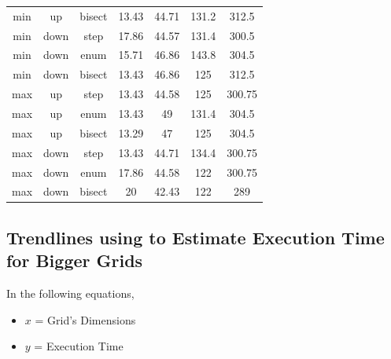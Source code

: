 \documentclass[runningheads]{llncs}
\begin{document}
\begin{table} [h]
\begin{tabularx}{\textwidth}{|C|C|C|C|C|C|C|}
        min      & up   & bisect & 13.43 & 44.71 & 131.2  & 312.5  \\
        min      & down & step   & 17.86 & 44.57 & 131.4  & 300.5  \\
        min      & down & enum   & 15.71 & 46.86 & 143.8  & 304.5  \\
        min      & down & bisect & 13.43 & 46.86 & 125    & 312.5  \\
        max      & up   & step   & 13.43 & 44.58 & 125    & 300.75 \\
        max      & up   & enum   & 13.43 & 49    & 131.4  & 304.5  \\
        max      & up   & bisect & 13.29 & 47    & 125    & 304.5  \\
        max      & down & step   & 13.43 & 44.71 & 134.4  & 300.75 \\
        max      & down & enum   & 17.86 & 44.58 & 122    & 300.75 \\
        max      & down & bisect & 20    & 42.43 & 122    & 289    \\
        \hline
    \end{tabularx}
\end{table}

\newpage
\subsection{Trendlines using to Estimate Execution Time for Bigger Grids} \label{trendlines}
In the following equations,
\begin{itemize}
    \item \(x\) = Grid's Dimensions
    \item \(y\) = Execution Time
\end{itemize}
\end{document}
